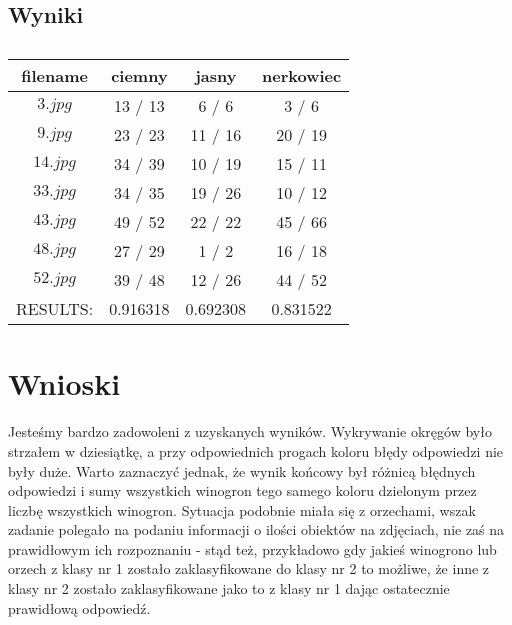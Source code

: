 \documentclass{classrep}
\begin{document}
\subsection{Wyniki}

\begin{table}[H]
  \centering
  \caption{}
  \label{tab:tab1}
  \begin{tabular}{|c|c|c|c|}
    \hline
          filename & ciemny & jasny & nerkowiec\\
    \hline
          $3.jpg$  & 13 / 13 &   6 /  6 &   3 /  6 \\
    \hline
          $9.jpg$  & 23 / 23 &  11 / 16 &  20 / 19 \\
    \hline
          $14.jpg$ & 34 / 39 &  10 / 19 &  15 / 11 \\
    \hline
          $33.jpg$ & 34 / 35 &  19 / 26 &  10 / 12 \\
    \hline
          $43.jpg$ & 49 / 52 &  22 / 22 &  45 / 66 \\
    \hline
          $48.jpg$ & 27 / 29 &   1 /  2 &  16 / 18 \\
    \hline
          $52.jpg$ & 39 / 48 &  12 / 26 &  44 / 52 \\
    \hline
          RESULTS: &   0.916318& 0.692308& 0.831522\\
    \hline
    \hline
  \end{tabular}
\end{table}

\section{Wnioski}

Jesteśmy bardzo zadowoleni z uzyskanych wyników. Wykrywanie okręgów było strzałem w dziesiątkę, a przy odpowiednich progach koloru błędy odpowiedzi nie były duże. Warto zaznaczyć jednak, że wynik końcowy był różnicą błędnych odpowiedzi i sumy wszystkich winogron tego samego koloru dzielonym przez liczbę wszystkich winogron. Sytuacja podobnie miała się z orzechami, wszak zadanie polegało na podaniu informacji o ilości obiektów na zdjęciach, nie zaś na prawidłowym ich rozpoznaniu - stąd też, przykładowo gdy jakieś winogrono lub orzech z klasy nr 1 zostało zaklasyfikowane do klasy nr  2 to możliwe, że inne z klasy nr 2 zostało zaklasyfikowane jako to z klasy nr 1 dając ostatecznie prawidłową odpowiedź.
\end{document}
